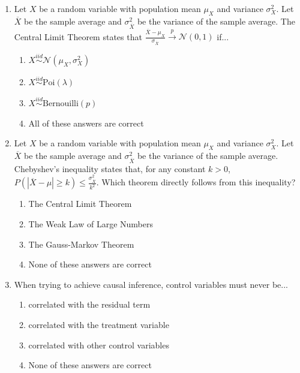 \documentclass{article}
\begin{document}
\begin{enumerate}
\item Let $X$ be a random variable with population mean $\mu_X$ and variance $\sigma^2_{X}$. Let $\overline{X}$ be the sample average and $\sigma^2_{\overline{X}}$ be the variance of the sample average. The Central Limit Theorem states that $\frac{\overline{X}-\mu_X}{\sigma_{\overline{X}}}\overset{p}{\to}\mathcal{N}(0,1)$ if...

\begin{enumerate}[label=\alph*)]
\item $X\stackrel{iid}{\sim}\mathcal{N}(\mu_X, \sigma_X^2)$
\item $X\stackrel{iid}{\sim}\text{Poi}(\lambda)$
\item $X\stackrel{iid}{\sim}\text{Bernouilli}(p)$
\item All of these answers are correct
\end{enumerate}\vspace{.25cm}

\item Let $X$ be a random variable with population mean $\mu_X$ and variance $\sigma^2_{X}$. Let $\overline{X}$ be the sample average and $\sigma^2_{\overline{X}}$ be the variance of the sample average. Chebyshev’s inequality states that, for any constant $k>0$, $P\left( |\overline{X} - \mu| \geq k \right) \leq \frac{\sigma^2_{\overline{X}}}{k^2}$. Which theorem directly follows from this inequality?

\begin{enumerate}[label=\alph*)]
\item The Central Limit Theorem
\item The Weak Law of Large Numbers
\item The Gauss-Markov Theorem 
\item None of these answers are correct
\end{enumerate}\vspace{.25cm}

\item When trying to achieve causal inference, control variables must never be...

\begin{enumerate}[label=\alph*)]
\item correlated with the residual term
\item correlated with the treatment variable
\item correlated with other control variables
\item None of these answers are correct
\end{enumerate}\vspace{.25cm}



\end{enumerate}
\end{document}
